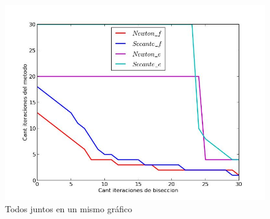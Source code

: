 \begin{figure}[!h]
	\begin{center}
		  \includegraphics[keepaspectratio]{../Imagenes/exp4/experimento_biseccion_5.jpg}
		  \caption{Todos juntos en un mismo gráfico}
		  \label{fig:contra1}
	\end{center}
\end{figure}
\FloatBarrier
